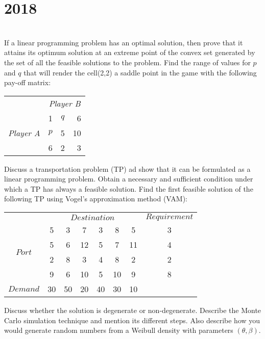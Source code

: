 \section*{2018}
\vspace{-.5cm}
\hrulefill \smallskip\\
 If a linear programming problem has an optimal solution, then prove that it attains its optimum solution at an extreme point of the convex set generated by the set of all the feasible solutions to the problem.
\myline
{} Find the range of values for $p$ and $q$ that will render the cell(2,2) a saddle point in the game with the following pay-off matrix:
\begin{center}
    \begin{tabular}{l|lcr|}
    \multicolumn{1}{c}{}& \multicolumn{3}{c}{\textit{Player B}} \\\cline{2-4}
    \multirow{3}{*}{\textit{Player A}}& 1 & $q$ & 6 \\
    & $p$ & 5 & 10 \\
    & 6 & 2 & 3 \\ \cline{2-4}
    \end{tabular}
\end{center}
\myline
{} Discuss a transportation problem (TP) ad show that it can be formulated as a linear programming problem. Obtain a necessary and sufficient condition under which a TP has always a feasible solution. Find the first feasible solution of the following TP using Vogel's approximation method (VAM):
\begin{center}
    \begin{tabular}{l*{7}{c}}
     & \multicolumn{6}{c}{$Destination$} & $Requirement$\\\cline{2-7}
         \multicolumn{1}{c|}{\multirow{4}{*}{$Port$}} & 5 & 3 & 7 & 3 & 8 & \multicolumn{1}{c|}{5}& 3\\
         \multicolumn{1}{c|}{}& 5 & 6 & 12 & 5 & 7  &\multicolumn{1}{c|}{11}& 4\\
         \multicolumn{1}{c|}{}& 2 & 8 & 3 & 4 & 8  &\multicolumn{1}{c|}{2}& 2\\
         \multicolumn{1}{c|}{}& 9 & 6 & 10 & 5 & 10  &\multicolumn{1}{c|}{9}& 8\\ \cline{2-7}
         $Demand$ & 30 &50 & 20 & 40 & 30 & 10 & 
    \end{tabular}
\end{center}
 Discuss whether the solution is degenerate or non-degenerate.
 \myline
  Describe the Monte Carlo simulation technique and mention its different steps. Also describe how you would generate random numbers from a Weibull density with parameters $(\theta,\beta)$.
